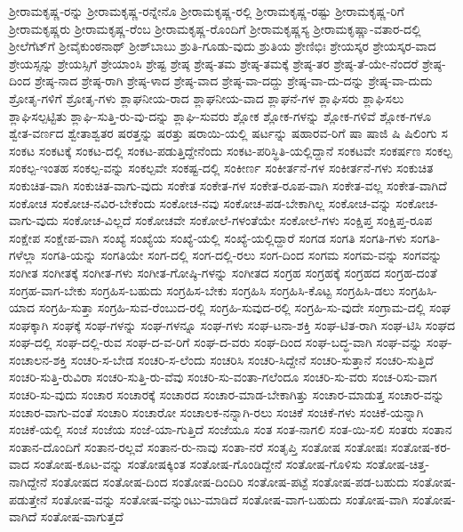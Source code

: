 {ಶ್ರೀರಾಮಕೃಷ್ಣ-ರನ್ನು
ಶ್ರೀರಾಮಕೃಷ್ಣ-ರನ್ನೇನೊ
ಶ್ರೀರಾಮಕೃಷ್ಣ-ರಲ್ಲಿ
ಶ್ರೀರಾಮಕೃಷ್ಣ-ರಷ್ಟು
ಶ್ರೀರಾಮಕೃಷ್ಣ-ರಿಗೆ
ಶ್ರೀರಾಮಕೃಷ್ಣರು
ಶ್ರೀರಾಮಕೃಷ್ಣ-ರೆಂಬ
ಶ್ರೀರಾಮಕೃಷ್ಣ-ರೊಂದಿಗೆ
ಶ್ರೀರಾಮಕೃಷ್ಣಸ್ಯ
ಶ್ರೀರಾಮಕೃಷ್ಣಾ-ವತಾರ-ದಲ್ಲಿ
ಶ್ರೀಲೆಗೆಟ್‌ಗೆ
ಶ್ರೀವೈಕುಂಠನಾಥ್
ಶ್ರೀಶ್‌ಬಾಬು
ಶ್ರುತಿ-ಗೂಡು-ವುದು
ಶ್ರುತಿಯ
ಶ್ರೇಣಿಭಿಃ
ಶ್ರೇಯಸ್ಕರ
ಶ್ರೇಯಸ್ಕರ-ವಾದ
ಶ್ರೇಯಸ್ಸನ್ನು
ಶ್ರೇಯಸ್ಸಿಗೆ
ಶ್ರೇಯಾಂಸಿ
ಶ್ರೇಷ್ಟ
ಶ್ರೇಷ್ಠ
ಶ್ರೇಷ್ಠ-ತಮ
ಶ್ರೇಷ್ಠ-ತಮಕ್ಕೆ
ಶ್ರೇಷ್ಠ-ತರ
ಶ್ರೇಷ್ಠ-ತೆ-ಯೇ-ನೆಂದರೆ
ಶ್ರೇಷ್ಠ-ದಿಂದ
ಶ್ರೇಷ್ಠ-ನಾದ
ಶ್ರೇಷ್ಠ-ರಾಗಿ
ಶ್ರೇಷ್ಠ-ಳಾದ
ಶ್ರೇಷ್ಠ-ವಾದ
ಶ್ರೇಷ್ಠ-ವಾ-ದದ್ದು
ಶ್ರೇಷ್ಠ-ವಾ-ದು-ದನ್ನು
ಶ್ರೇಷ್ಠ-ವಾ-ದುದು
ಶ್ರೋತೃ-ಗಳಿಗೆ
ಶ್ರೋತೃ-ಗಳು
ಶ್ಲಾಘನೀಯ-ರಾದ
ಶ್ಲಾಘನೀಯ-ವಾದ
ಶ್ಲಾಘನೆ-ಗಳ
ಶ್ಲಾಘಿಸರು
ಶ್ಲಾಘಿಸಲು
ಶ್ಲಾಘಿಸಲ್ಪಟ್ಟಿತು
ಶ್ಲಾಘಿ-ಸುತ್ತಿ-ರು-ವು-ದನ್ನು
ಶ್ಲಾಘಿ-ಸುವರು
ಶ್ಲೋಕ
ಶ್ಲೋಕ-ಗಳನ್ನು
ಶ್ಲೋಕ-ಗಳಿವೆ
ಶ್ಲೋಕ-ಗಳೂ
ಶ್ವೇತ-ವರ್ಣದ
ಶ್ವೇತಾಶ್ವತರ
ಷರತ್ತನ್ನು
ಷರತ್ತು
ಷರಾಯಿ-ಯಲ್ಲಿ
ಷರ್ಟನ್ನು
ಷಹಾರವ-ರಿಗೆ
ಷಾ
ಷಾಜಿ
ಷಿ
ಷಿಲಿಂಗು
ಸ
ಸಂಕಟ
ಸಂಕಟಕ್ಕೆ
ಸಂಕಟ-ದಲ್ಲಿ
ಸಂಕಟ-ಪಡುತ್ತಿದ್ದೇನೆಂದು
ಸಂಕಟ-ಪರಿಸ್ಥಿತಿ-ಯಲ್ಲಿದ್ದಾನೆ
ಸಂಕಟವೇ
ಸಂಕರ್ಷಣ
ಸಂಕಲ್ಪ
ಸಂಕಲ್ಪ-ಇಂತಹ
ಸಂಕಲ್ಪ-ವನ್ನು
ಸಂಕಲ್ಪವೇ
ಸಂಕಷ್ಟ-ದಲ್ಲಿ
ಸಂಕೀರ್ಣ
ಸಂಕೀರ್ತನೆ-ಗಳ
ಸಂಕೀರ್ತನೆ-ಗಳು
ಸಂಕುಚಿತ
ಸಂಕುಚಿತ-ವಾಗಿ
ಸಂಕುಚಿತ-ವಾಗು-ವುದು
ಸಂಕೇತ
ಸಂಕೇತ-ಗಳ
ಸಂಕೇತ-ರೂಪ-ವಾಗಿ
ಸಂಕೇತ-ವಲ್ಲ
ಸಂಕೇತ-ವಾಗಿದೆ
ಸಂಕೋಚ
ಸಂಕೋಚ-ನವಿರ-ಬೇಕೆಂದು
ಸಂಕೋಚ-ನವು
ಸಂಕೋಚ-ಪಡ-ಬೇಕಾಗಿಲ್ಲ
ಸಂಕೋಚ-ವನ್ನು
ಸಂಕೋಚ-ವಾಗು-ವುದು
ಸಂಕೋಚ-ವಿಲ್ಲದೆ
ಸಂಕೋಚವೇ
ಸಂಕೋಲೆ-ಗಳಂತೆಯೇ
ಸಂಕೋಲೆ-ಗಳು
ಸಂಕ್ಷಿಪ್ತ
ಸಂಕ್ಷಿಪ್ತ-ರೂಪ
ಸಂಕ್ಷೇಪ
ಸಂಕ್ಷೇಪ-ವಾಗಿ
ಸಂಖ್ಯೆ
ಸಂಖ್ಯೆಯ
ಸಂಖ್ಯೆ-ಯಲ್ಲಿ
ಸಂಖ್ಯೆ-ಯಲ್ಲಿದ್ದಾರೆ
ಸಂಗಡ
ಸಂಗತಿ
ಸಂಗತಿ-ಗಳು
ಸಂಗತಿ-ಗಳೆಲ್ಲಾ
ಸಂಗತಿ-ಯನ್ನು
ಸಂಗತಿಯೇ
ಸಂಗ-ದಲ್ಲಿ
ಸಂಗ-ದಲ್ಲಿ-ರಲು
ಸಂಗ-ದಿಂದ
ಸಂಗಮ
ಸಂಗಮ-ವನ್ನು
ಸಂಗವನ್ನು
ಸಂಗೀತ
ಸಂಗೀತಕ್ಕೆ
ಸಂಗೀತ-ಗಳು
ಸಂಗೀತ-ಗೋಷ್ಠಿ-ಗಳನ್ನು
ಸಂಗೀತದ
ಸಂಗ್ರಹ
ಸಂಗ್ರಹಕ್ಕೆ
ಸಂಗ್ರಹದ
ಸಂಗ್ರಹ-ದಂತೆ
ಸಂಗ್ರಹ-ವಾಗ-ಬೇಕು
ಸಂಗ್ರಹಿಸ-ಬಹುದು
ಸಂಗ್ರಹಿಸ-ಬೇಕು
ಸಂಗ್ರಹಿಸಿ
ಸಂಗ್ರಹಿಸಿ-ಕೊಟ್ಟ
ಸಂಗ್ರಹಿಸಿ-ಡಲು
ಸಂಗ್ರಹಿಸಿ-ಯಾದ
ಸಂಗ್ರಹಿ-ಸುತ್ತಾ
ಸಂಗ್ರಹಿ-ಸುವ-ರೆಂಬುದ-ರಲ್ಲಿ
ಸಂಗ್ರಹಿ-ಸುವುದ-ರಲ್ಲಿ
ಸಂಗ್ರಹಿ-ಸು-ವುದೇ
ಸಂಗ್ರಾಮ-ದಲ್ಲಿ
ಸಂಘ
ಸಂಘಕ್ಕಾಗಿ
ಸಂಘಕ್ಕೆ
ಸಂಘ-ಗಳನ್ನು
ಸಂಘ-ಗಳನ್ನೂ
ಸಂಘ-ಗಳು
ಸಂಘ-ಟನಾ-ಶಕ್ತಿ
ಸಂಘ-ಟಿತ-ರಾಗಿ
ಸಂಘ-ಟಿಸಿ
ಸಂಘದ
ಸಂಘ-ದಲ್ಲಿ
ಸಂಘ-ದಲ್ಲಿ-ರುವ
ಸಂಘ-ದ-ವ-ರಿಗೆ
ಸಂಘ-ದ-ವರು
ಸಂಘ-ದಿಂದ
ಸಂಘ-ಬದ್ಧ-ವಾಗಿ
ಸಂಘ-ವನ್ನು
ಸಂಘ-ಸಂಚಾಲನ-ಶಕ್ತಿ
ಸಂಚರಿ-ಸ-ಬೇಡ
ಸಂಚರಿ-ಸ-ಲೆಂದು
ಸಂಚರಿಸಿ
ಸಂಚರಿ-ಸಿದ್ದೇನೆ
ಸಂಚರಿ-ಸುತ್ತಾನೆ
ಸಂಚರಿ-ಸುತ್ತಿದೆ
ಸಂಚರಿ-ಸುತ್ತಿ-ರುವಿರಾ
ಸಂಚರಿ-ಸುತ್ತಿ-ರು-ವೆವು
ಸಂಚರಿ-ಸು-ವಂತಾ-ಗಲೆಂದೂ
ಸಂಚರಿ-ಸು-ವರು
ಸಂಚ-ರಿಸು-ವಾಗ
ಸಂಚರಿ-ಸು-ವುದು
ಸಂಚಾರ
ಸಂಚಾರಕ್ಕೆ
ಸಂಚಾರದ
ಸಂಚಾರ-ಮಾಡ-ಬೇಕಾಗಿತ್ತು
ಸಂಚಾರ-ಮಾಡುತ್ತ
ಸಂಚಾರ-ವನ್ನು
ಸಂಚಾರ-ವಾಗು-ವಂತೆ
ಸಂಚಾರಿ
ಸಂಚಾರೋ
ಸಂಚಾಲಕ-ನನ್ನಾಗಿ-ರಲು
ಸಂಚಿಕೆ
ಸಂಚಿಕೆ-ಗಳು
ಸಂಚಿಕೆ-ಯನ್ನಾಗಿ
ಸಂಚಿಕೆ-ಯಲ್ಲಿ
ಸಂಜೆ
ಸಂಜೆಯ
ಸಂಜೆ-ಯಾ-ಗುತ್ತಿದೆ
ಸಂಜೆಯೂ
ಸಂತ
ಸಂತ-ನಾಗಲಿ
ಸಂತ-ಯಿ-ಸಲಿ
ಸಂತರು
ಸಂತಾನ
ಸಂತಾನ-ದೊಂದಿಗೆ
ಸಂತಾನ-ರಲ್ಲವೆ
ಸಂತಾನ-ರು-ನಾವು
ಸಂತಾ-ನರೆ
ಸಂತೃಪ್ತಿ
ಸಂತೋಷ
ಸಂತೋಷಃ
ಸಂತೋಷ-ಕರ-ವಾದ
ಸಂತೋಷ-ಕೂಟ-ವನ್ನು
ಸಂತೋಷಕ್ಕಿಂತ
ಸಂತೋಷ-ಗೊಂಡಿದ್ದೇನೆ
ಸಂತೋಷ-ಗೊಳಿಸು
ಸಂತೋಷ-ಚಿತ್ತ-ನಾಗಿದ್ದೇನೆ
ಸಂತೋಷದ
ಸಂತೋಷ-ದಿಂದ
ಸಂತೋಷ-ದಿಂದಿರಿ
ಸಂತೋಷ-ಪಟ್ಟೆ
ಸಂತೋಷ-ಪಡ-ಬಹುದು
ಸಂತೋಷ-ಪಡುತ್ತೇನೆ
ಸಂತೋಷ-ವನ್ನು
ಸಂತೋಷ-ವನ್ನುಂಟು-ಮಾಡಿದೆ
ಸಂತೋಷ-ವಾಗ-ಬಹುದು
ಸಂತೋಷ-ವಾಗಿ
ಸಂತೋಷ-ವಾಗಿದೆ
ಸಂತೋಷ-ವಾಗುತ್ತದೆ
}
